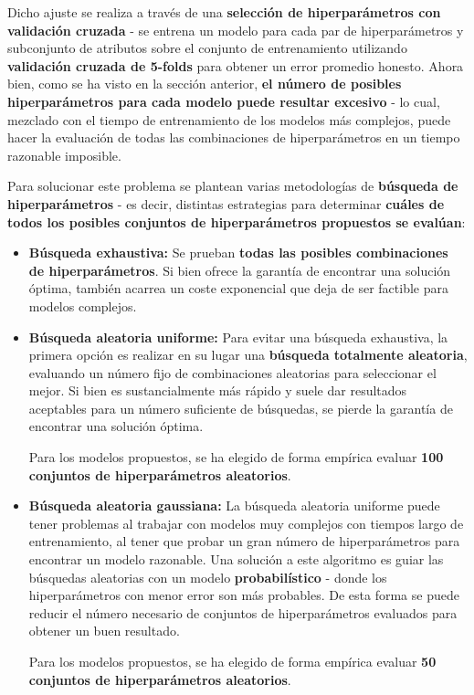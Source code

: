 Dicho ajuste se realiza a través de una \textbf{selección de hiperparámetros con validación cruzada} - se entrena un modelo para cada par de hiperparámetros y subconjunto de atributos sobre el conjunto de entrenamiento utilizando \textbf{validación cruzada de 5-folds} para obtener un error promedio honesto. Ahora bien, como se ha visto en la sección anterior, \textbf{el número de posibles hiperparámetros para cada modelo puede resultar excesivo} - lo cual, mezclado con el tiempo de entrenamiento de los modelos más complejos, puede hacer la evaluación de todas las combinaciones de hiperparámetros en un tiempo razonable imposible. 

Para solucionar este problema se plantean varias metodologías de \textbf{búsqueda de hiperparámetros} - es decir, distintas estrategias para determinar \textbf{cuáles de todos los posibles conjuntos de hiperparámetros propuestos se evalúan}:
\begin{itemize}[parsep=2pt, itemsep=2pt, topsep=4pt]
	\item \textbf{Búsqueda exhaustiva:} Se prueban \textbf{todas las posibles combinaciones de hiperparámetros}. Si bien ofrece la garantía de encontrar una solución óptima, también acarrea un coste exponencial que deja de ser factible para modelos complejos.
	
	\item \textbf{Búsqueda aleatoria uniforme:} Para evitar una búsqueda exhaustiva, la primera opción es realizar en su lugar una \textbf{búsqueda totalmente aleatoria}, evaluando un número fijo de combinaciones aleatorias para seleccionar el mejor. Si bien es sustancialmente más rápido y suele dar resultados aceptables para un número suficiente de búsquedas, se pierde la garantía de encontrar una solución óptima.
	
	Para los modelos propuestos, se ha elegido de forma empírica evaluar \textbf{100 conjuntos de hiperparámetros aleatorios}.
	
	\item \textbf{Búsqueda aleatoria gaussiana:} La búsqueda aleatoria uniforme puede tener problemas al trabajar con modelos muy complejos con tiempos largo de entrenamiento, al tener que probar un gran número de hiperparámetros para encontrar un modelo razonable. Una solución a este algoritmo es guiar las búsquedas aleatorias con un modelo \textbf{probabilístico} - donde los hiperparámetros con menor error son más probables. De esta forma se puede reducir el número necesario de conjuntos de hiperparámetros evaluados para obtener un buen resultado. 
	
	Para los modelos propuestos, se ha elegido de forma empírica evaluar \textbf{50 conjuntos de hiperparámetros aleatorios}.
\end{itemize}


